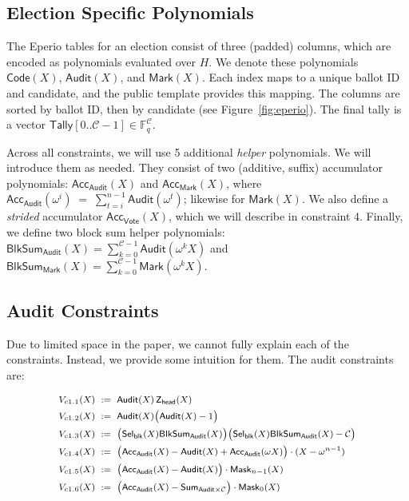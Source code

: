 \subsection{Election Specific Polynomials}

The Eperio tables for an election consist of three (padded) columns, which are encoded as polynomials evaluated over $H$. We denote these polynomials $\mathsf{Code}(X)$, $\mathsf{Audit}(X)$, and $\mathsf{Mark}(X)$. Each index maps to a unique ballot ID and candidate, and the public template provides this mapping. The columns are sorted by ballot ID, then by candidate (see Figure~\ref{fig:eperio}). The final tally is a vector $\mathsf{Tally}[0..\mathcal{C}-1]\in\mathbb{F}_q^{\mathcal{C}}$.

Across all constraints, we will use 5 additional \emph{helper} polynomials. We will introduce them as needed. They consist of two (additive, suffix) accumulator polynomials: $\mathsf{Acc}_{\mathsf{Audit}}(X)$ and $\mathsf{Acc}_{\mathsf{Mark}}(X)$, where $\mathsf{Acc}_{\mathsf{Audit}}(\omega^{i}) \;=\; \sum_{t=i}^{n-1} \mathsf{Audit}(\omega^{t})$; likewise for $\mathsf{Mark}(X)$. We also define a \emph{strided} accumulator $\mathsf{Acc}_{\mathsf{Vote}}(X)$, which we will describe in constraint 4. Finally, we define two block sum helper polynomials: $\mathsf{BlkSum}_{\mathsf{Audit}}(X)=\sum_{k=0}^{\mathcal{C}-1}\mathsf{Audit}(\omega^k X)$ and $\mathsf{BlkSum}_{\mathsf{Mark}}(X)=\sum_{k=0}^{\mathcal{C}-1}\mathsf{Mark}(\omega^k X)$.

\subsection{Audit Constraints}
\label{sec:audit}

Due to limited space in the paper, we cannot fully explain each of the \constraints constraints. Instead, we provide some intuition for them. The audit constraints are:

\begin{mdframed}[linewidth=0.6pt,backgroundcolor=verylightpink,innerleftmargin=6pt,innerrightmargin=6pt,innertopmargin=4pt,innerbottommargin=4pt]
\[
\footnotesize
\begin{aligned}
V_{c1.1}(X)\ &:=\ \mathsf{Audit}(X)\,\mathsf{Z}_{\mathsf{head}}(X)\\
V_{c1.2}(X)\ &:=\ \mathsf{Audit}(X)\bigl(\mathsf{Audit}(X)-1\bigr) \\
V_{c1.3}(X)\ &:=\ \bigl(\mathsf{Sel}_{\mathsf{blk}}(X)\mathsf{BlkSum}_{\mathsf{Audit}}(X)\bigr)\bigl(\mathsf{Sel}_{\mathsf{blk}}(X)\mathsf{BlkSum}_{\mathsf{Audit}}(X)-\mathcal{C}\bigr) \\
V_{c1.4}(X)\ &:=\ \bigl(\mathsf{Acc}_{\mathsf{Audit}}(X)-\mathsf{Audit}(X)+\mathsf{Acc}_{\mathsf{Audit}}(\omega X)\bigr)\cdot(X-\omega^{n-1})\\
V_{c1.5}(X)\ &:=\ \bigl(\mathsf{Acc}_{\mathsf{Audit}}(X)-\mathsf{Audit}(X)\bigr)\cdot \mathsf{Mask}_{n-1}(X)\\
V_{c1.6}(X)\ &:=\ \bigl(\mathsf{Acc}_{\mathsf{Audit}}(X)-\mathsf{Sum}_{\mathsf{Audit}\times\mathcal{C}}\bigr)\cdot \mathsf{Mask}_{0}(X)
\end{aligned}
\]
\end{mdframed}


